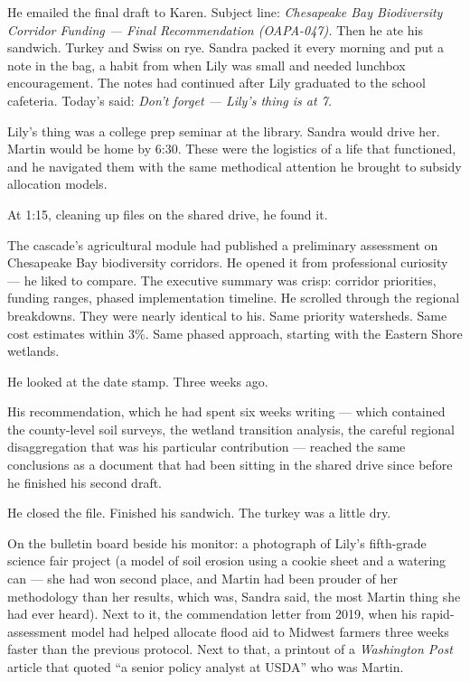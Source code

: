 He emailed the final draft to Karen. Subject line: \emph{Chesapeake Bay Biodiversity Corridor Funding --- Final Recommendation (OAPA-047).} Then he ate his sandwich. Turkey and Swiss on rye. Sandra packed it every morning and put a note in the bag, a habit from when Lily was small and needed lunchbox encouragement. The notes had continued after Lily graduated to the school cafeteria. Today's said: \emph{Don't forget --- Lily's thing is at 7.}

Lily's thing was a college prep seminar at the library. Sandra would drive her. Martin would be home by 6:30. These were the logistics of a life that functioned, and he navigated them with the same methodical attention he brought to subsidy allocation models.

At 1:15, cleaning up files on the shared drive, he found it.

The cascade's agricultural module had published a preliminary assessment on Chesapeake Bay biodiversity corridors. He opened it from professional curiosity --- he liked to compare. The executive summary was crisp: corridor priorities, funding ranges, phased implementation timeline. He scrolled through the regional breakdowns. They were nearly identical to his. Same priority watersheds. Same cost estimates within 3\%. Same phased approach, starting with the Eastern Shore wetlands.

He looked at the date stamp. Three weeks ago.

His recommendation, which he had spent six weeks writing --- which contained the county-level soil surveys, the wetland transition analysis, the careful regional disaggregation that was his particular contribution --- reached the same conclusions as a document that had been sitting in the shared drive since before he finished his second draft.

He closed the file. Finished his sandwich. The turkey was a little dry.

On the bulletin board beside his monitor: a photograph of Lily's fifth-grade science fair project (a model of soil erosion using a cookie sheet and a watering can --- she had won second place, and Martin had been prouder of her methodology than her results, which was, Sandra said, the most Martin thing she had ever heard). Next to it, the commendation letter from 2019, when his rapid-assessment model had helped allocate flood aid to Midwest farmers three weeks faster than the previous protocol. Next to that, a printout of a \emph{Washington Post} article that quoted ``a senior policy analyst at USDA'' who was Martin.

